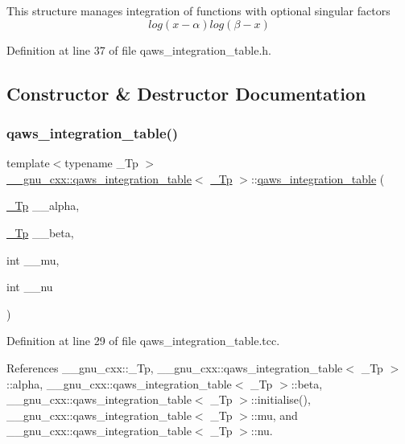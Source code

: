 This structure manages integration of functions with optional singular factors \[ log(x - \alpha) log(\beta - x) \] 

Definition at line 37 of file qaws\+\_\+integration\+\_\+table.\+h.



\subsection{Constructor \& Destructor Documentation}
\mbox{\label{struct____gnu__cxx_1_1qaws__integration__table_a2fc28f96d3219257c427f50bb6928510}} 
\subsubsection{\texorpdfstring{qaws\+\_\+integration\+\_\+table()}{qaws\_integration\_table()}}
{\footnotesize\ttfamily template$<$typename \+\_\+\+Tp $>$ \\
\hyperlink{struct____gnu__cxx_1_1qaws__integration__table}{\+\_\+\+\_\+gnu\+\_\+cxx\+::qaws\+\_\+integration\+\_\+table}$<$ \hyperlink{namespace____gnu__cxx_a3b19a9c800ca194374ef9172290f7d79}{\+\_\+\+Tp} $>$\+::\hyperlink{struct____gnu__cxx_1_1qaws__integration__table}{qaws\+\_\+integration\+\_\+table} (\begin{DoxyParamCaption}\item[{\hyperlink{namespace____gnu__cxx_a3b19a9c800ca194374ef9172290f7d79}{\+\_\+\+Tp}}]{\+\_\+\+\_\+alpha,  }\item[{\hyperlink{namespace____gnu__cxx_a3b19a9c800ca194374ef9172290f7d79}{\+\_\+\+Tp}}]{\+\_\+\+\_\+beta,  }\item[{int}]{\+\_\+\+\_\+mu,  }\item[{int}]{\+\_\+\+\_\+nu }\end{DoxyParamCaption})}



Definition at line 29 of file qaws\+\_\+integration\+\_\+table.\+tcc.



References \+\_\+\+\_\+gnu\+\_\+cxx\+::\+\_\+\+Tp, \+\_\+\+\_\+gnu\+\_\+cxx\+::qaws\+\_\+integration\+\_\+table$<$ \+\_\+\+Tp $>$\+::alpha, \+\_\+\+\_\+gnu\+\_\+cxx\+::qaws\+\_\+integration\+\_\+table$<$ \+\_\+\+Tp $>$\+::beta, \+\_\+\+\_\+gnu\+\_\+cxx\+::qaws\+\_\+integration\+\_\+table$<$ \+\_\+\+Tp $>$\+::initialise(), \+\_\+\+\_\+gnu\+\_\+cxx\+::qaws\+\_\+integration\+\_\+table$<$ \+\_\+\+Tp $>$\+::mu, and \+\_\+\+\_\+gnu\+\_\+cxx\+::qaws\+\_\+integration\+\_\+table$<$ \+\_\+\+Tp $>$\+::nu.


